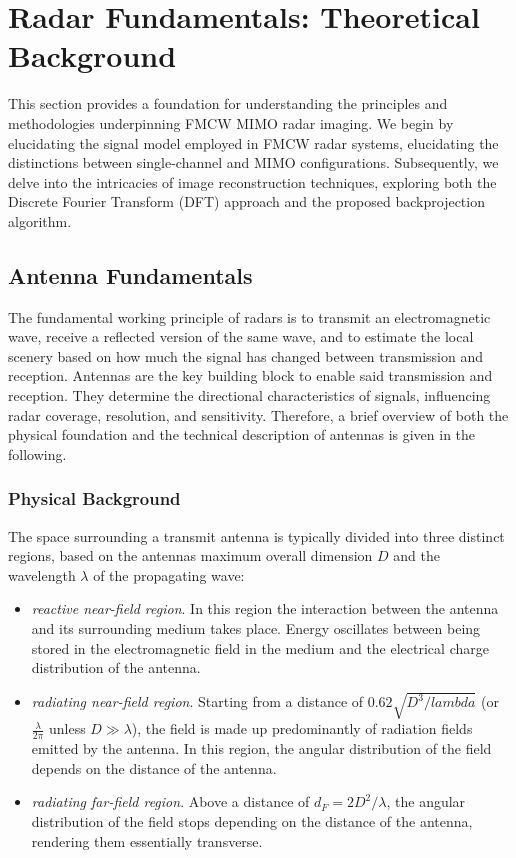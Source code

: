 \chapter{Radar Fundamentals: Theoretical Background}
This section provides a foundation for understanding the principles and methodologies underpinning FMCW MIMO radar imaging.
We begin by elucidating the signal model employed in FMCW radar systems,
elucidating the distinctions between single-channel and MIMO configurations.
Subsequently, we delve into the intricacies of image reconstruction techniques,
exploring both the Discrete Fourier Transform (DFT) approach and the proposed backprojection algorithm.

\section{Antenna Fundamentals}

The fundamental working principle of radars is to transmit an electromagnetic wave,
receive a reflected version of the same wave,
and to estimate the local scenery based on how much the signal has changed between transmission and reception.
Antennas are the key building block to enable said transmission and reception.
They determine the directional characteristics of signals,
influencing radar coverage, resolution, and sensitivity.
Therefore, a brief overview of both the physical foundation
and the technical description of antennas is given in the following.

\subsection{Physical Background}

The space surrounding a transmit antenna is typically divided into three distinct regions,
based on the antennas maximum overall dimension $D$ and the wavelength $\lambda$ of the propagating wave:
\begin{itemize}
    \item \emph{reactive near-field region}.
          In this region the interaction between the antenna and its surrounding medium takes place.
          Energy oscillates between being stored in the electromagnetic field in the medium
          and the electrical charge distribution of the antenna.

    \item \emph{radiating near-field region}.
          Starting from a distance of $0.62\sqrt{D^3/lambda}$ (or $\frac{\lambda}{2\pi}$ unless $D\gg\lambda$),
          the field is made up predominantly of radiation fields emitted by the antenna.
          In this region, the angular distribution of the field depends on the distance of the antenna.

    \item \emph{radiating far-field region}.
          Above a distance of $d_F = 2D^2/\lambda$,
          the angular distribution of the field stops depending on the distance of the antenna,
          rendering them essentially transverse.
\end{itemize}

